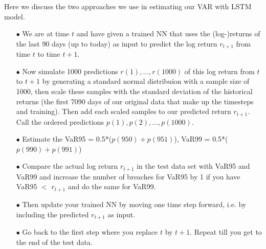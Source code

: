 \documentclass[a4paper,11pt,oneside]{book}
\begin{document}
Here we discuss the two approaches we use in estimating our VAR with LSTM model. 
\begin{itemize}
	
\item[$\bullet$]   We are at time $t$ and have given a trained NN that uses the (log-)returns of the last 90 days (up to
today) as input to predict the log return $r_{t+1}$ from time $t$ to time $t+1$.
\item[$\bullet$]      Now simulate 1000 predictions $r(1), ..., r(1000)$ of this log return from $t$ to $t+1$ by generating a standard normal distribuion with a sample size of 1000, then scale these samples with the standard deviation of the historical returns (the first 7090 days of our original data that make up the timesteps and training). Then add each scaled samples to  our predicted return $r_{t+1}$. Call the ordered
predictions $p(1),p(2),...,p(1000)$.

\item[$\bullet$] Estimate the VaR95 = 0.5*($p(950)+p(951)$), VaR99 = 0.5*($p(990)+p(991)$)


\item[$\bullet$] Compare the actual log return $r_{t+1}$ in the test data set with VaR95 and VaR99 and increase the number
of breaches for VaR95 by 1 if you have VaR95 $<$ $r_{t+1}$ and do the same for VaR99.

\item[$\bullet$] Then update your trained NN by moving one time step forward, i.e. by including the predicted $r_{t+1}$ as input.
\item[$\bullet$] Go back to the first step where you replace $t$ by $t+1$. Repeat till you get to the end of the test data.

\end{itemize}


\end{document}
